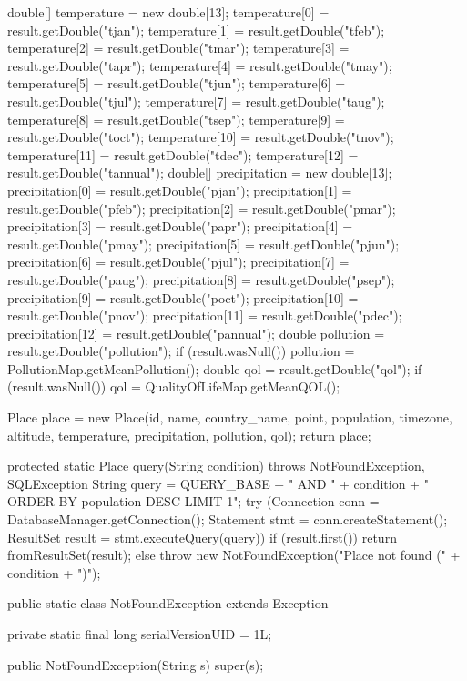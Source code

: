 \begin{javacode}
{{    double[] temperature = new double[13];
    temperature[0] = result.getDouble("tjan");
    temperature[1] = result.getDouble("tfeb");
    temperature[2] = result.getDouble("tmar");
    temperature[3] = result.getDouble("tapr");
    temperature[4] = result.getDouble("tmay");
    temperature[5] = result.getDouble("tjun");
    temperature[6] = result.getDouble("tjul");
    temperature[7] = result.getDouble("taug");
    temperature[8] = result.getDouble("tsep");
    temperature[9] = result.getDouble("toct");
    temperature[10] = result.getDouble("tnov");
    temperature[11] = result.getDouble("tdec");
    temperature[12] = result.getDouble("tannual");
    double[] precipitation = new double[13];
    precipitation[0] = result.getDouble("pjan");
    precipitation[1] = result.getDouble("pfeb");
    precipitation[2] = result.getDouble("pmar");
    precipitation[3] = result.getDouble("papr");
    precipitation[4] = result.getDouble("pmay");
    precipitation[5] = result.getDouble("pjun");
    precipitation[6] = result.getDouble("pjul");
    precipitation[7] = result.getDouble("paug");
    precipitation[8] = result.getDouble("psep");
    precipitation[9] = result.getDouble("poct");
    precipitation[10] = result.getDouble("pnov");
    precipitation[11] = result.getDouble("pdec");
    precipitation[12] = result.getDouble("pannual");
    double pollution = result.getDouble("pollution");
    if (result.wasNull()) {
      pollution = PollutionMap.getMeanPollution();
    }
    double qol = result.getDouble("qol");
    if (result.wasNull()) {
      qol = QualityOfLifeMap.getMeanQOL();
    }

    Place place = new Place(id, name, country_name, point, population, timezone, altitude,
        temperature, precipitation, pollution, qol);
    return place;
  }

  protected static Place query(String condition) throws NotFoundException, SQLException {
    String query = QUERY_BASE + " AND " + condition + " ORDER BY population DESC LIMIT 1";
    try (Connection conn = DatabaseManager.getConnection();
        Statement stmt = conn.createStatement();
        ResultSet result = stmt.executeQuery(query)) {
      if (result.first()) {
        return fromResultSet(result);
      } else {
        throw new NotFoundException("Place not found (" + condition + ")");
      }
    }
  }

  public static class NotFoundException extends Exception {
    private static final long serialVersionUID = 1L;

    public NotFoundException(String s) {
      super(s);
    }
  }

}
\end{javacode}

